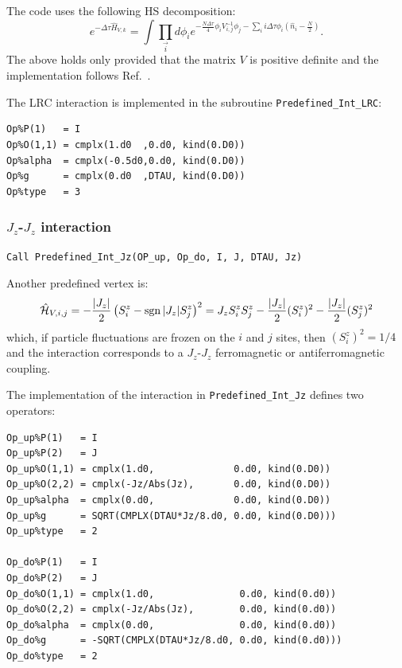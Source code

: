   The code uses the following  HS decomposition:
\begin{equation}
e^{-\Delta \tau \hat{H}_{V,k} }  =  \int \prod_{\vec{i}} d \phi_{i}   e^{ - \frac{N \Delta \tau} {4} \phi_{i} V^{-1}_{i,j}  \phi_{j} - \sum_{i}  i \Delta \tau \phi_i \left( \hat{n}_{i} - \frac{N}{2} \right) }.
\end{equation}
The above holds only provided that the matrix $V$ is positive definite and the implementation follows Ref.~\cite{Hohenadler14}.   

The LRC interaction is implemented in the subroutine \texttt{Predefined\_Int\_LRC}:
\begin{lstlisting}[style=fortran,ndkeywords={type},ndkeywordstyle=\color{black}\ttfamily]
Op%P(1)   = I
Op%O(1,1) = cmplx(1.d0  ,0.d0, kind(0.D0))
Op%alpha  = cmplx(-0.5d0,0.d0, kind(0.D0))
Op%g      = cmplx(0.d0  ,DTAU, kind(0.D0)) 
Op%type   = 3
\end{lstlisting}


\subsubsection{$J_z$-$J_z$ interaction}

\begin{lstlisting}[style=fortran]
Call Predefined_Int_Jz(OP_up, Op_do, I, J, DTAU, Jz)
\end{lstlisting}

Another predefined vertex is:
\begin{align}
\hat{\mathcal{H}}_{V,i,j} =
- \frac{|J_z|}{2}  \left( S^{z}_i - \operatorname{sgn}|J_z| S^{z}_j \right)^2 =
J_z  S^{z}_i  S^{z}_j  - \frac{|J_z|}{2} (S^{z}_i)^2 - \frac{|J_z|}{2}(S^{z}_j)^2 
\end{align} 
which, if particle fluctuations are frozen on the $i$ and $j$ sites, then $(S^{z}_i)^2 = 1/4$ and the interaction corresponds to a $J_z$-$J_z$ ferromagnetic or antiferromagnetic coupling.

The implementation of the interaction in \texttt{Predefined\_Int\_Jz} defines two operators:
\begin{lstlisting}[style=fortran,ndkeywords={type},ndkeywordstyle=\color{black}\ttfamily]
Op_up%P(1)   = I
Op_up%P(2)   = J
Op_up%O(1,1) = cmplx(1.d0,              0.d0, kind(0.D0))
Op_up%O(2,2) = cmplx(-Jz/Abs(Jz),       0.d0, kind(0.D0))
Op_up%alpha  = cmplx(0.d0,              0.d0, kind(0.D0))
Op_up%g      = SQRT(CMPLX(DTAU*Jz/8.d0, 0.d0, kind(0.D0))) 
Op_up%type   = 2

Op_do%P(1)   = I
Op_do%P(2)   = J
Op_do%O(1,1) = cmplx(1.d0,               0.d0, kind(0.d0))
Op_do%O(2,2) = cmplx(-Jz/Abs(Jz),        0.d0, kind(0.d0))
Op_do%alpha  = cmplx(0.d0,               0.d0, kind(0.d0))
Op_do%g      = -SQRT(CMPLX(DTAU*Jz/8.d0, 0.d0, kind(0.d0))) 
Op_do%type   = 2

\end{lstlisting}



